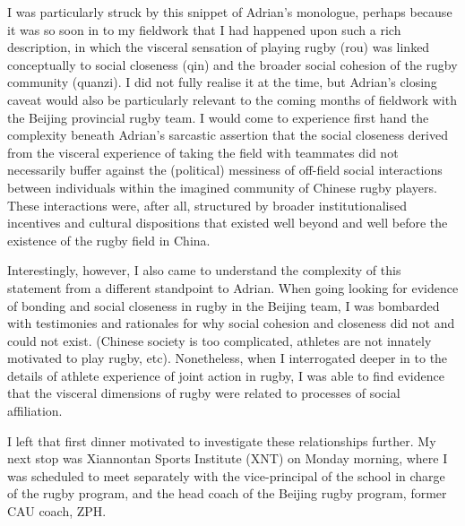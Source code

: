 I was particularly struck by this snippet of Adrian's monologue, perhaps because it was so soon in to my fieldwork that I had happened upon such a rich description, in which the visceral sensation of playing rugby (rou) was linked conceptually to social closeness (qin) and the broader social cohesion of the rugby community (quanzi).  I did not fully realise it at the time, but Adrian's closing caveat would also be particularly relevant to the coming months of fieldwork with the Beijing provincial rugby team. I would come to experience first hand the complexity beneath Adrian's sarcastic assertion that the social closeness derived from the visceral experience of taking the field with teammates did not necessarily buffer against the (political) messiness of off-field social interactions between individuals within the imagined community of Chinese rugby players.  These interactions were, after all, structured by broader institutionalised incentives and cultural dispositions that existed well beyond and well before the existence of the rugby field in China.

Interestingly, however, I also came to understand the complexity of this statement from a different standpoint to Adrian.  When going looking for evidence of bonding and social closeness in rugby in the Beijing team, I was bombarded with testimonies and rationales for why social cohesion and closeness did not and could not exist.  (Chinese society is too complicated, athletes are not innately motivated to play rugby, etc).  Nonetheless, when I interrogated deeper in to the details of athlete experience of joint action in rugby, I was able to find evidence that the visceral dimensions of rugby were related to processes of social affiliation.

I left that first dinner motivated to investigate these relationships further.  My next stop was Xiannontan Sports Institute (XNT) on Monday morning, where I was scheduled to meet separately with the vice-principal of the school in charge of the rugby program, and the head coach of the Beijing rugby program, former CAU coach, ZPH.
